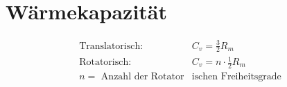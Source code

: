 \documentclass[twocolumn]{article}
\begin{document}
\section{Wärmekapazität}

\begin{align*}
	\text{Translatorisch: }  &C_v = \frac{3}{2} R_m  \\
	 \text{Rotatorisch: }  &C_v = n \cdot \frac{1}{2} R_m \\
	 n = \text{ Anzahl der Rotator} & \text{ischen Freiheitsgrade} \\
\end{align*}




%
%
\end{document}
